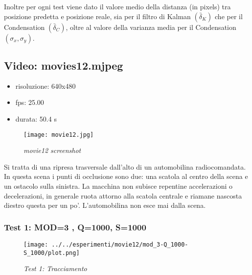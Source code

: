 Inoltre per ogni test viene dato il valore medio della distanza (in pixels) tra posizione predetta e posizione reale, sia per il filtro di Kalman \begin{math}(\bar \delta_K)\end{math} che per il Condensation \begin{math}(\bar \delta_C)\end{math}, oltre al valore della varianza media per il Condensation \begin{math}(\sigma_x,\sigma_y)\end{math}.


\newpage

\subsection{Video: movies12.mjpeg}\label{sec:video-occ}
\begin{itemize}
\item risoluzione: 640x480
\item fps: 25.00
\item durata: 50.4 s
\end{itemize}

\begin{figure}[hb]
\centering
	\texttt{[image: movie12.jpg]}
\caption{\textit{movie12 screenshot}}
\end{figure}

Si tratta di una ripresa trasversale dall'alto di un automobilina radiocomandata. In questa scena i punti di occlusione sono due: una scatola al centro della scena e un ostacolo sulla sinistra. La macchina non subisce repentine accelerazioni o decelerazioni, in generale ruota attorno alla scatola centrale e riamane nascosta diestro questa per un po'. L'automobilina non esce mai dalla scena.

 
\newpage
\subsubsection{Test 1: MOD=3 , Q=1000, S=1000}

\begin{figure}[hb]
\centering
	\texttt{[image: ../../esperimenti/movie12/mod\_3-Q\_1000-S\_1000/plot.png]}
\caption{\textit{Test 1: Tracciamento}}
\end{figure}

